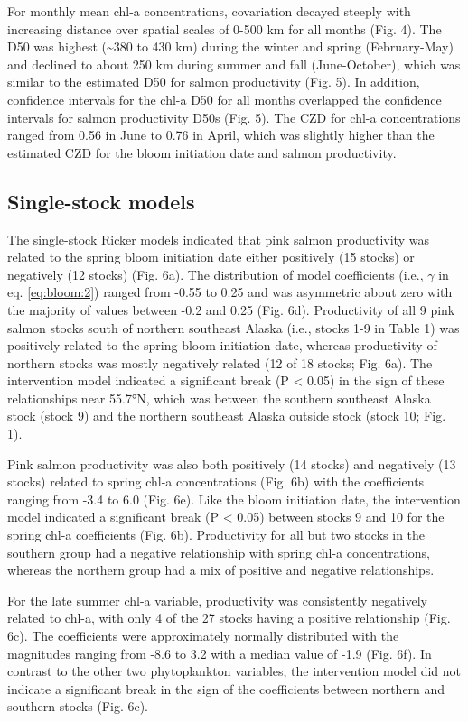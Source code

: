 For monthly mean chl-a concentrations, covariation decayed steeply with
increasing distance over spatial scales of 0-500 km for all months (Fig.  4).
The D50 was highest (\textasciitilde{}380 to 430 km) during the winter and
spring (February-May) and declined to about 250 km during summer and fall
(June-October), which was similar to the estimated D50 for salmon productivity
(Fig. 5). In addition, confidence intervals for the chl-a D50 for all months
overlapped the confidence intervals for salmon productivity D50s (Fig. 5). The
CZD for chl-a concentrations ranged from 0.56 in June to 0.76 in April, which
was slightly higher than the estimated CZD for the bloom initiation date and
salmon productivity.


\subsection{Single-stock models}

The single-stock Ricker models indicated that pink salmon productivity was
related to the spring bloom initiation date either positively (15 stocks) or
negatively (12 stocks) (Fig. 6a). The distribution of model coefficients (i.e.,
\(\gamma\) in eq. \ref{eq:bloom:2}) ranged from -0.55 to 0.25 and was asymmetric about zero
with the majority of values between -0.2 and 0.25 (Fig. 6d). Productivity of all
9 pink salmon stocks south of northern southeast Alaska (i.e., stocks 1-9 in
Table 1) was positively related to the spring bloom initiation date, whereas
productivity of northern stocks was mostly negatively related (12 of 18 stocks;
Fig.  6a). The intervention model indicated a significant break (P \textless{}
0.05) in the sign of these relationships near 55.7°N, which was between the
southern southeast Alaska stock (stock 9) and the northern southeast Alaska
outside stock (stock 10; Fig. 1).

Pink salmon productivity was also both positively (14 stocks) and negatively (13
stocks) related to spring chl-a concentrations (Fig. 6b) with the coefficients
ranging from -3.4 to 6.0 (Fig. 6e). Like the bloom initiation date, the
intervention model indicated a significant break (P \textless{} 0.05) between
stocks 9 and 10 for the spring chl-a coefficients (Fig. 6b). Productivity for
all but two stocks in the southern group had a negative relationship with spring
chl-a concentrations, whereas the northern group had a mix of positive and
negative relationships.

For the late summer chl-a variable, productivity was consistently negatively
related to chl-a, with only 4 of the 27 stocks having a positive relationship
(Fig. 6c). The coefficients were approximately normally distributed with the
magnitudes ranging from -8.6 to 3.2 with a median value of -1.9 (Fig. 6f). In
contrast to the other two phytoplankton variables, the intervention model did
not indicate a significant break in the sign of the coefficients between
northern and southern stocks (Fig. 6c).

